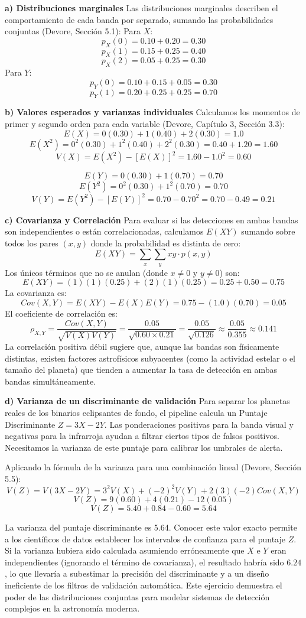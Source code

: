 \textbf{a) Distribuciones marginales}
Las distribuciones marginales describen el comportamiento de cada banda por separado, sumando las probabilidades conjuntas (Devore, Sección 5.1):
Para $X$:
$$ p_X(0) = 0.10 + 0.20 = 0.30 $$
$$ p_X(1) = 0.15 + 0.25 = 0.40 $$
$$ p_X(2) = 0.05 + 0.25 = 0.30 $$
Para $Y$:
$$ p_Y(0) = 0.10 + 0.15 + 0.05 = 0.30 $$
$$ p_Y(1) = 0.20 + 0.25 + 0.25 = 0.70 $$

\textbf{b) Valores esperados y varianzas individuales}
Calculamos los momentos de primer y segundo orden para cada variable (Devore, Capítulo 3, Sección 3.3):
$$ E(X) = 0(0.30) + 1(0.40) + 2(0.30) = 1.0 $$
$$ E(X^2) = 0^2(0.30) + 1^2(0.40) + 2^2(0.30) = 0.40 + 1.20 = 1.60 $$
$$ V(X) = E(X^2) - [E(X)]^2 = 1.60 - 1.0^2 = 0.60 $$

$$ E(Y) = 0(0.30) + 1(0.70) = 0.70 $$
$$ E(Y^2) = 0^2(0.30) + 1^2(0.70) = 0.70 $$
$$ V(Y) = E(Y^2) - [E(Y)]^2 = 0.70 - 0.70^2 = 0.70 - 0.49 = 0.21 $$

\textbf{c) Covarianza y Correlación}
Para evaluar si las detecciones en ambas bandas son independientes o están correlacionadas, calculamos $E(XY)$ sumando sobre todos los pares $(x,y)$ donde la probabilidad es distinta de cero:
$$ E(XY) = \sum_{x} \sum_{y} xy \cdot p(x,y) $$
Los únicos términos que no se anulan (donde $x \neq 0$ y $y \neq 0$) son:
$$ E(XY) = (1)(1)(0.25) + (2)(1)(0.25) = 0.25 + 0.50 = 0.75 $$
La covarianza es:
$$ Cov(X,Y) = E(XY) - E(X)E(Y) = 0.75 - (1.0)(0.70) = 0.05 $$
El coeficiente de correlación es:
$$ \rho_{X,Y} = \frac{Cov(X,Y)}{\sqrt{V(X)V(Y)}} = \frac{0.05}{\sqrt{0.60 \times 0.21}} = \frac{0.05}{\sqrt{0.126}} \approx \frac{0.05}{0.355} \approx 0.141 $$
La correlación positiva débil sugiere que, aunque las bandas son físicamente distintas, existen factores astrofísicos subyacentes (como la actividad estelar o el tamaño del planeta) que tienden a aumentar la tasa de detección en ambas bandas simultáneamente.

\textbf{d) Varianza de un discriminante de validación}
Para separar los planetas reales de los binarios eclipsantes de fondo, el pipeline calcula un Puntaje Discriminante $Z = 3X - 2Y$. Las ponderaciones positivas para la banda visual y negativas para la infrarroja ayudan a filtrar ciertos tipos de falsos positivos. Necesitamos la varianza de este puntaje para calibrar los umbrales de alerta.

Aplicando la fórmula de la varianza para una combinación lineal (Devore, Sección 5.5):
$$ V(Z) = V(3X - 2Y) = 3^2 V(X) + (-2)^2 V(Y) + 2(3)(-2) Cov(X,Y) $$
$$ V(Z) = 9(0.60) + 4(0.21) - 12(0.05) $$
$$ V(Z) = 5.40 + 0.84 - 0.60 = 5.64 $$

La varianza del puntaje discriminante es 5.64. Conocer este valor exacto permite a los científicos de datos establecer los intervalos de confianza para el puntaje $Z$. Si la varianza hubiera sido calculada asumiendo erróneamente que $X$ e $Y$ eran independientes (ignorando el término de covarianza), el resultado habría sido $6.24$, lo que llevaría a subestimar la precisión del discriminante y a un diseño ineficiente de los filtros de validación automática. Este ejercicio demuestra el poder de las distribuciones conjuntas para modelar sistemas de detección complejos en la astronomía moderna.
